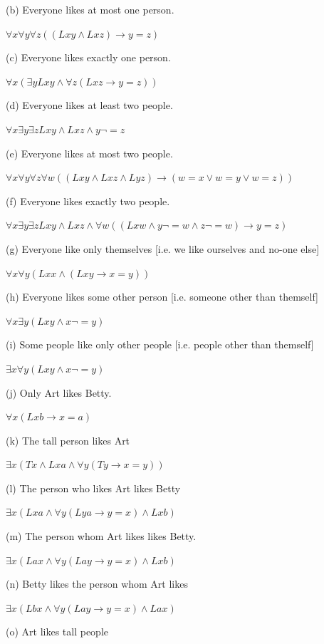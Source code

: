 \documentclass[12pt]{article}
\begin{document}
(b) Everyone likes at most one person. 

$\forall x \forall y \forall z ((Lxy \land Lxz) \rightarrow y = z)$

(c) Everyone likes exactly one person. 

$\forall x (\exists y Lxy \land \forall z (Lxz \rightarrow y = z))$

(d) Everyone likes at least two people. 

$\forall x \exists y \exists z Lxy \land Lxz \land y \lnot = z$

(e) Everyone likes at most two people. 

$\forall x \forall y \forall z \forall w ((Lxy \land Lxz \land Lyz) \rightarrow (w = x \lor w = y \lor w = z))$

(f) Everyone likes exactly two people. 

$\forall x \exists y \exists z Lxy \land Lxz \land \forall w ((Lxw \land y \lnot = w \land z \lnot = w) \rightarrow y = z)$

(g) Everyone like only themselves [i.e. we like ourselves and no-one else] 

$\forall x \forall y (Lxx \land (Lxy \rightarrow x = y))$

(h) Everyone likes some other person [i.e. someone other than themself] 

$\forall x \exists y (Lxy \land x \lnot = y)$

(i) Some people like only other people [i.e. people other than themself] 

$\exists x \forall y (Lxy \land x \lnot = y)$

(j) Only Art likes Betty. 

$\forall x (Lxb \rightarrow x = a)$

(k) The tall person likes Art 

$\exists x (Tx \land Lxa \land \forall y ( Ty \rightarrow x = y) )$

(l) The person who likes Art likes Betty 

$\exists x (Lxa \land \forall y (Lya \rightarrow y = x) \land Lxb)$

(m) The person whom Art likes likes Betty. 

$\exists x (Lax \land \forall y (Lay \rightarrow y = x) \land Lxb)$

(n) Betty likes the person whom Art likes 

$\exists x (Lbx \land \forall y (Lay \rightarrow y = x) \land Lax)$

(o) Art likes tall people 
\end{document}
